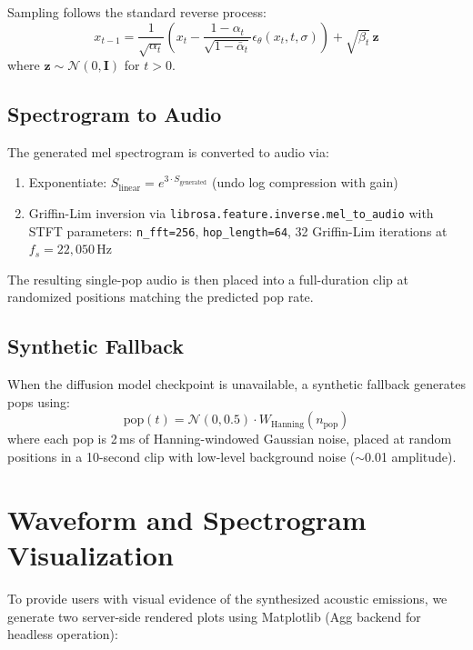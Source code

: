 \documentclass[11pt,a4paper,twocolumn]{article}
\begin{document}
Sampling follows the standard reverse process:
\begin{equation}
    x_{t-1} = \frac{1}{\sqrt{\alpha_t}} \left( x_t - \frac{1 - \alpha_t}{\sqrt{1 - \bar{\alpha}_t}} \epsilon_\theta(x_t, t, \sigma) \right) + \sqrt{\beta_t}\, \mathbf{z}
\end{equation}
where $\mathbf{z} \sim \mathcal{N}(0, \mathbf{I})$ for $t > 0$.

\subsection{Spectrogram to Audio}

The generated mel spectrogram is converted to audio via:
\begin{enumerate}[nosep]
    \item Exponentiate: $S_{\text{linear}} = e^{3 \cdot S_{\text{generated}}}$ (undo log compression with gain)
    \item Griffin-Lim inversion via \texttt{librosa.feature.inverse.mel\_to\_audio} with STFT parameters: \texttt{n\_fft=256}, \texttt{hop\_length=64}, 32 Griffin-Lim iterations at $f_s = 22{,}050$\,Hz
\end{enumerate}

The resulting single-pop audio is then placed into a full-duration clip at randomized positions matching the predicted pop rate.

\subsection{Synthetic Fallback}

When the diffusion model checkpoint is unavailable, a synthetic fallback generates pops using:
\begin{equation}
    \text{pop}(t) = \mathcal{N}(0, 0.5) \cdot W_{\text{Hanning}}(n_{\text{pop}})
\end{equation}
where each pop is 2\,ms of Hanning-windowed Gaussian noise, placed at random positions in a 10-second clip with low-level background noise ($\sim$0.01 amplitude).


\section{Waveform and Spectrogram Visualization}
\label{sec:viz}

To provide users with visual evidence of the synthesized acoustic emissions, we generate two server-side rendered plots using Matplotlib (Agg backend for headless operation):
\end{document}
